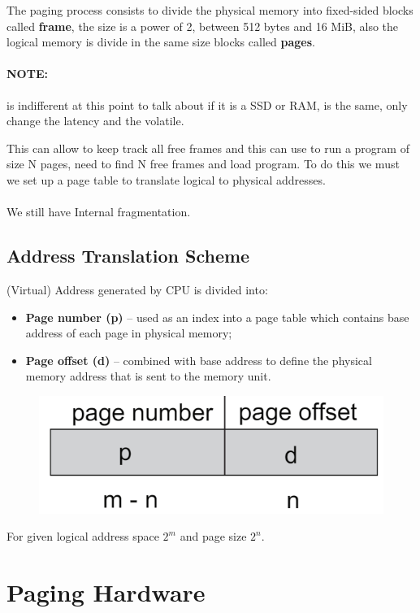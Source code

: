 The paging process consists to divide the physical memory into fixed-sided blocks called \textbf{frame}, the size is a power of 2, between 512 bytes and 16 MiB, also the logical memory is divide in the same size blocks called \textbf{pages}.

\paragraph{NOTE: } is indifferent at this point to talk about if it is a SSD or RAM, is the same, only change the latency and the volatile.

This can allow to keep track all free frames and this can use to run a program of size N pages, need to find N free frames and
load program. To do this we must we set up a page table to translate logical to physical addresses. 
\paragraph{}
We still have Internal fragmentation.

\subsection{Address Translation Scheme}

(Virtual) Address generated by CPU is divided into:

\begin{itemize}
    \item \textbf{Page number (p)} – used as an index into a page table which contains base address of each page in physical memory;
    \item \textbf{Page offset (d)} – combined with base address to define the physical memory address that is sent to the memory unit.
\end{itemize}


\begin{figure}[htbp]
    \centering
    \includegraphics[width=0.4\linewidth]{img/yuj,.png}
\end{figure}

For given logical address space $2^m$ and page size $2^n$.

\newpage
\section{Paging Hardware}

